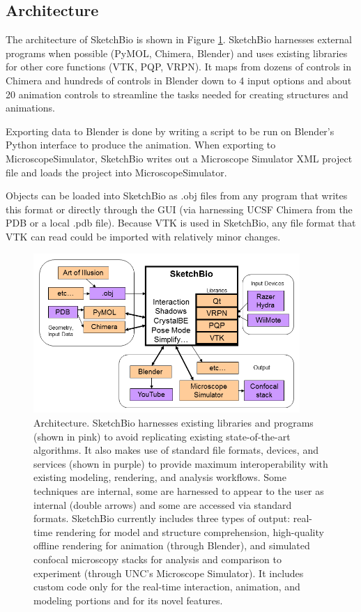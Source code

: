 \documentclass[twocolumn]{bmcart}%
\begin{document}
\subsection*{Architecture}

The architecture of SketchBio is shown in Figure \ref{fig:architecture}.
SketchBio harnesses external programs when possible (PyMOL, Chimera, Blender) and uses existing libraries for other core functions (VTK, PQP, VRPN).
It maps from dozens of controls in Chimera and hundreds of controls in Blender down to 4 input options and about 20 animation controls to streamline the tasks needed for creating structures and animations.

Exporting data to Blender is done by writing a script to be run on Blender's Python interface to produce the animation.
When exporting to MicroscopeSimulator, SketchBio writes out a Microscope Simulator XML project file and loads the project into MicroscopeSimulator.

Objects can be loaded into SketchBio as .obj files from any program that writes this format or directly through the GUI (via harnessing UCSF Chimera from the PDB or a local .pdb file).
Because VTK is used in SketchBio, any file format that VTK can read could be imported with relatively minor changes.

\begin{figure}[ht]
    \begin{center}
    \noindent\includegraphics[width=0.9\textwidth]
    {system_diagram.png}
    \end{center}
\caption{Architecture.
SketchBio harnesses existing libraries and programs (shown in pink) to avoid replicating existing state-of-the-art algorithms.
It also makes use of standard file formats, devices, and services (shown in purple) to provide maximum interoperability with existing modeling, rendering, and analysis workflows.
Some techniques are internal, some are harnessed to appear to the user as internal (double arrows) and some are accessed via standard formats.
SketchBio currently includes three types of output: real-time rendering for model and structure comprehension, high-quality offline rendering for animation (through Blender), and simulated confocal microscopy stacks for analysis and comparison to experiment (through UNC's Microscope Simulator).
It includes custom code only for the real-time interaction, animation, and modeling portions and for its novel features.}
\label{fig:architecture}
\end{figure}
\end{document}

